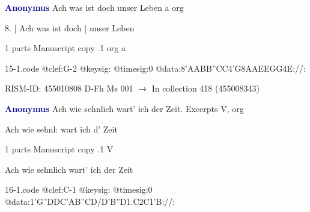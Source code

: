 \documentclass[twocolumn]{book}
\begin{document}
\newline \par \vspace{7pt} \textcolor{darkblue}{\textbf{Anonymus  }}
\newline Ach was ist doch unser Leben  a  
\newline org
\newline \begin{itshape}[f.6v, at left:] 8. | Ach was ist doch | unser Leben\end{itshape} 
\newline \textcolor{darkblue}{}  1 parts  
\newline Manuscript copy
.1  org  a  
\begin{filecontents*}{15-1.code}
@clef:G-2
@keysig:
@timesig:0
@data:{8'AABB}{''CC}4'G{8AAEE}{GG}4E://:
\end{filecontents*}
\newline
%

\newline RISM-ID: 455010808
\newline D-Fh  Ms 001
\newline $\rightarrow$ In collection 418 (455008343)

\newline \par \vspace{7pt} \textcolor{darkblue}{\textbf{Anonymus  }}
\newline Ach wie sehnlich wart' ich der Zeit. Excerpts    
\newline V, org
\newline \begin{itshape}[f.123v, heading:] Ach wie sehnl: wart ich d' Zeit\end{itshape} 
\newline \textcolor{darkblue}{}  1 parts  
\newline Manuscript copy
.1  V
\newline \begin{footnotesize} Ach wie sehnlich wart' ich der Zeit \end{footnotesize}  
\begin{filecontents*}{16-1.code}
@clef:C-1
@keysig:
@timesig:0
@data:1'G''DDC'AB''CD/D'B''D1.C2C1'B://:
\end{filecontents*}
\newline
%
\end{document}
